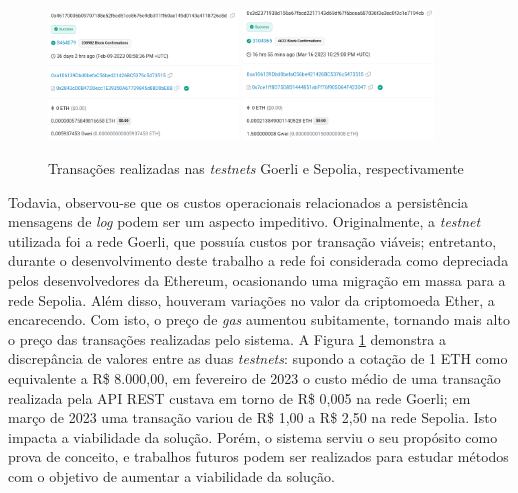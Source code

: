 \begin{figure}
    \centering
    \includegraphics[width=0.45\textwidth]{img/Cap4/tx goerli.png}
    \includegraphics[width=0.45\textwidth]{img/Cap4/tx sepolia.png}
    \caption{Transações realizadas nas \emph{testnets} Goerli e Sepolia, respectivamente}
    \label{fig:preço_transacao}
\end{figure}

Todavia, observou-se que os custos operacionais relacionados a persistência mensagens de \emph{log} podem ser um aspecto impeditivo. Originalmente, a \emph{testnet} utilizada foi a rede Goerli, que possuía custos por transação viáveis; entretanto, durante o desenvolvimento deste trabalho a rede foi considerada como depreciada pelos desenvolvedores da Ethereum, ocasionando uma migração em massa para a rede Sepolia. Além disso, houveram variações no valor da criptomoeda Ether, a encarecendo. Com isto, o preço de \emph{gas} aumentou subitamente, tornando mais alto o preço das transações realizadas pelo sistema. A Figura \ref{fig:preço_transacao} demonstra a discrepância de valores entre as duas \emph{testnets}: supondo a cotação de 1 ETH como equivalente a R\$ 8.000,00, em fevereiro de 2023 o custo médio de uma transação realizada pela API REST custava em torno de R\$ 0,005 na rede Goerli; em março de 2023 uma transação variou de R\$ 1,00 a R\$ 2,50 na rede Sepolia. Isto impacta a viabilidade da solução. Porém, o sistema serviu o seu propósito como prova de conceito, e trabalhos futuros podem ser realizados para estudar métodos com o objetivo de aumentar a viabilidade da solução.

